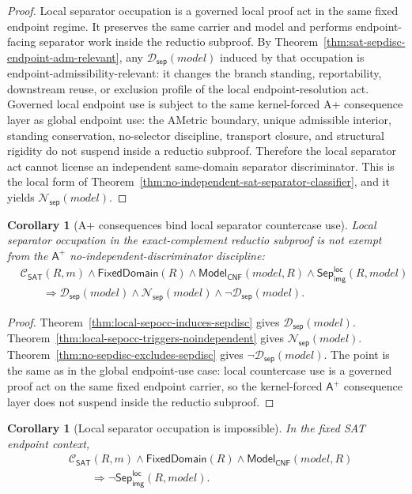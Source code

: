\documentclass[11pt]{article}
\newtheorem{corollary}[theorem]{Corollary}
\theoremstyle{definition}
\theoremstyle{remark}
\newcommand{\LocalSepImgOcc}{\mathsf{Sep}_{\mathsf{img}}^{\mathsf{loc}}}
\newcommand{\Aplus}{\mathsf{A}^{+}}
\newcommand{\ClayCtx}{\mathcal{C}_{\mathsf{SAT}}(R,m)}
\newcommand{\FixedDom}{\mathsf{FixedDomain}}
\newcommand{\SepDisc}{\mathcal{D}_{\mathsf{sep}}}
\newcommand{\NoSepDisc}{\mathcal{N}_{\mathsf{sep}}}
\newcommand{\ModelOfCnf}{\mathsf{Model}_{\mathsf{CNF}}}
\begin{document}
\begin{proof}
Local separator occupation is a governed local proof act in the same fixed endpoint regime. It preserves the same carrier and model and performs endpoint-facing separator work inside the reductio subproof. By Theorem~\ref{thm:sat-sepdisc-endpoint-adm-relevant}, any \(\SepDisc(model)\) induced by that occupation is endpoint-admissibility-relevant: it changes the branch standing, reportability, downstream reuse, or exclusion profile of the local endpoint-resolution act. Governed local endpoint use is subject to the same kernel-forced A+ consequence layer as global endpoint use: the AMetric boundary, unique admissible interior, standing conservation, no-selector discipline, transport closure, and structural rigidity do not suspend inside a reductio subproof. Therefore the local separator act cannot license an independent same-domain separator discriminator. This is the local form of Theorem~\ref{thm:no-independent-sat-separator-classifier}, and it yields \(\NoSepDisc(model)\).
\end{proof}


\begin{corollary}[A+ consequences bind local separator countercase use]
\label{cor:aplus-binds-local-separator-countercase-use}
Local separator occupation in the exact-complement reductio subproof is not exempt from the \(\Aplus\) no-independent-discriminator discipline:
\[
\begin{aligned}
  &\ClayCtx\wedge\FixedDom(R)\wedge\ModelOfCnf(model,R)\wedge\LocalSepImgOcc(R,model)\\
  &\qquad\Rightarrow \SepDisc(model)\wedge\NoSepDisc(model)\wedge\neg\SepDisc(model).
\end{aligned}
\]
\end{corollary}

\begin{proof}
Theorem~\ref{thm:local-sepocc-induces-sepdisc} gives \(\SepDisc(model)\). Theorem~\ref{thm:local-sepocc-triggers-noindependent} gives \(\NoSepDisc(model)\). Theorem~\ref{thm:no-sepdisc-excludes-sepdisc} gives \(\neg\SepDisc(model)\). The point is the same as in the global endpoint-use case: local countercase use is a governed proof act on the same fixed endpoint carrier, so the kernel-forced \(\Aplus\) consequence layer does not suspend inside the reductio subproof.
\end{proof}

\begin{corollary}[Local separator occupation is impossible]
\label{cor:local-sepocc-impossible}
In the fixed SAT endpoint context,
\[
\begin{aligned}
  &\ClayCtx\wedge\FixedDom(R)\wedge\ModelOfCnf(model,R)\\
  &\qquad\Rightarrow \neg\LocalSepImgOcc(R,model).
\end{aligned}
\]
\end{corollary}
\end{document}
